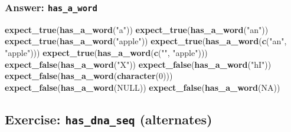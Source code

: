 \documentclass[]{book}
\newenvironment{Shaded}{}{}
\newcommand{\ControlFlowTok}[1]{\textcolor[rgb]{0.00,0.44,0.13}{\textbf{#1}}}
\newcommand{\DecValTok}[1]{\textcolor[rgb]{0.25,0.63,0.44}{#1}}
\newcommand{\KeywordTok}[1]{\textcolor[rgb]{0.00,0.44,0.13}{\textbf{#1}}}
\newcommand{\NormalTok}[1]{#1}
\newcommand{\OperatorTok}[1]{\textcolor[rgb]{0.40,0.40,0.40}{#1}}
\newcommand{\OtherTok}[1]{\textcolor[rgb]{0.00,0.44,0.13}{#1}}
\newcommand{\StringTok}[1]{\textcolor[rgb]{0.25,0.44,0.63}{#1}}
\begin{document}
\hypertarget{answer-has_a_word}{%
\subsubsection{\texorpdfstring{Answer: \texttt{has\_a\_word}}{Answer: has\_a\_word}}\label{answer-has_a_word}}

\begin{Shaded}
\end{Shaded}

\begin{Shaded}
\begin{Highlighting}[]
\KeywordTok{expect_true}\NormalTok{(}\KeywordTok{has_a_word}\NormalTok{(}\StringTok{"a"}\NormalTok{))}
\KeywordTok{expect_true}\NormalTok{(}\KeywordTok{has_a_word}\NormalTok{(}\StringTok{"an"}\NormalTok{))}
\KeywordTok{expect_true}\NormalTok{(}\KeywordTok{has_a_word}\NormalTok{(}\StringTok{"apple"}\NormalTok{))}
\KeywordTok{expect_true}\NormalTok{(}\KeywordTok{has_a_word}\NormalTok{(}\KeywordTok{c}\NormalTok{(}\StringTok{"an"}\NormalTok{, }\StringTok{"apple"}\NormalTok{)))}
\KeywordTok{expect_true}\NormalTok{(}\KeywordTok{has_a_word}\NormalTok{(}\KeywordTok{c}\NormalTok{(}\StringTok{""}\NormalTok{, }\StringTok{"apple"}\NormalTok{)))}
\KeywordTok{expect_false}\NormalTok{(}\KeywordTok{has_a_word}\NormalTok{(}\StringTok{"X"}\NormalTok{))}
\KeywordTok{expect_false}\NormalTok{(}\KeywordTok{has_a_word}\NormalTok{(}\StringTok{"hI"}\NormalTok{))}
\KeywordTok{expect_false}\NormalTok{(}\KeywordTok{has_a_word}\NormalTok{(}\KeywordTok{character}\NormalTok{(}\DecValTok{0}\NormalTok{)))}
\KeywordTok{expect_false}\NormalTok{(}\KeywordTok{has_a_word}\NormalTok{(}\OtherTok{NULL}\NormalTok{))}
\KeywordTok{expect_false}\NormalTok{(}\KeywordTok{has_a_word}\NormalTok{(}\OtherTok{NA}\NormalTok{))}
\end{Highlighting}
\end{Shaded}

\hypertarget{exercise-has_dna_seq-alternates}{%
\subsection{\texorpdfstring{Exercise: \texttt{has\_dna\_seq} (alternates)}{Exercise: has\_dna\_seq (alternates)}}\label{exercise-has_dna_seq-alternates}}
\end{document}
